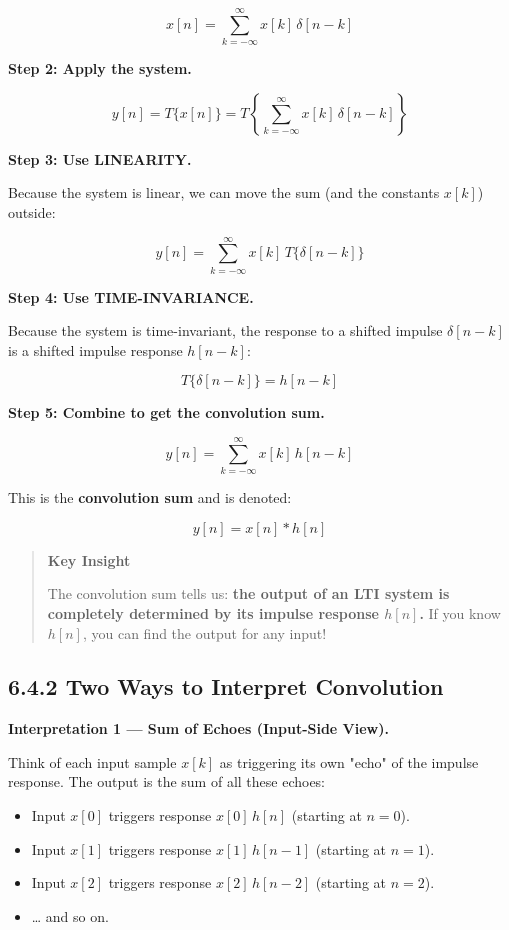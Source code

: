 \documentclass[11pt]{article}
\begin{document}
\[x[n] = \sum_{k=-\infty}^{\infty} x[k]\,\delta[n-k]\]

\textbf{Step 2: Apply the system.}

\[y[n] = T\{x[n]\} = T\!\left\{\sum_{k=-\infty}^{\infty} x[k]\,\delta[n-k]\right\}\]

\textbf{Step 3: Use LINEARITY.}

Because the system is linear, we can move the sum (and the constants $x[k]$) outside:

\[y[n] = \sum_{k=-\infty}^{\infty} x[k]\,T\{\delta[n-k]\}\]

\textbf{Step 4: Use TIME-INVARIANCE.}

Because the system is time-invariant, the response to a shifted impulse $\delta[n-k]$ is a shifted impulse response $h[n-k]$:

\[T\{\delta[n-k]\} = h[n-k]\]

\textbf{Step 5: Combine to get the convolution sum.}

\[\boxed{\,y[n] = \sum_{k=-\infty}^{\infty} x[k]\,h[n-k]\,}\]

This is the \textbf{convolution sum} and is denoted:

\[y[n] = x[n] * h[n]\]

\begin{quote}
\textbf{Key Insight}

The convolution sum tells us: \textbf{the output of an LTI system is completely determined by its impulse response $h[n]$.} If you know $h[n]$, you can find the output for any input!
\end{quote}

\subsection*{6.4.2 Two Ways to Interpret Convolution}

\textbf{Interpretation 1 — Sum of Echoes (Input-Side View).}

Think of each input sample $x[k]$ as triggering its own "echo" of the impulse response. The output is the sum of all these echoes:

\begin{itemize}
  \item Input $x[0]$ triggers response $x[0]\,h[n]$ (starting at $n=0$).
  \item Input $x[1]$ triggers response $x[1]\,h[n-1]$ (starting at $n=1$).
  \item Input $x[2]$ triggers response $x[2]\,h[n-2]$ (starting at $n=2$).
  \item … and so on.
\end{itemize}
\end{document}
